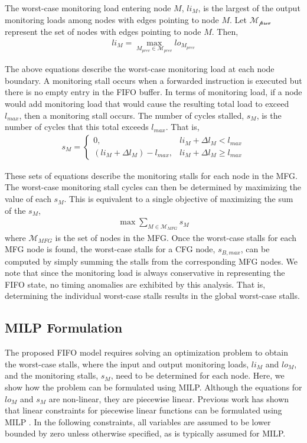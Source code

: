 The worst-case monitoring load entering node $M$, $li_{M}$, is the largest of
the output monitoring loads among nodes with edges pointing to node $M$. Let
$\mathcal{M_{\text{prev}}}$ represent the set of nodes with edges pointing to
node $M$. Then,
\begin{align*}
	li_{M} = \max_{M_{prev} \in \mathcal{M}_{prev}}lo_{M_{prev}}
\end{align*}

The above equations describe the worst-case monitoring load at each node
boundary.  A monitoring stall occurs when a forwarded instruction is executed
but there is no empty entry in the FIFO buffer. In terms of monitoring load, if
a node would add monitoring load that would cause the resulting total load to
exceed $l_{max}$, then a monitoring stall occurs. The number of cycles stalled,
$s_{M}$, is the number of cycles that this total exceeds $l_{max}$. That is,
\begin{align*}
	s_{M} =
		\begin{cases}
			0, &li_{M} + \Delta l_{M} < l_{max} \\
			(li_{M} + \Delta l_{M}) - l_{max}, &li_{M} + \Delta l_M \geq l_{max}
		\end{cases}
\end{align*}

These sets of equations describe the monitoring stalls for each node in the MFG.
The worst-case monitoring stall cycles can then be determined by maximizing the
value of each $s_M$. This is equivalent to a single objective of maximizing the
sum of the $s_M$,
\begin{align*}
  \max \sum_{M \in \mathcal{M}_{MFG}} s_{M}
\end{align*}
where $\mathcal{M}_{MFG}$ is the set of nodes in the MFG.  Once the worst-case
stalls for each MFG node is found, the worst-case stalls for a CFG node,
$s_{B,max}$, can be computed by simply summing the stalls from the
corresponding MFG nodes. We note that since the monitoring load is always
conservative in representing the FIFO state, no timing anomalies are exhibited
by this analysis. That is, determining the individual worst-case stalls results
in the global worst-case stalls.

\subsection{MILP Formulation}
\label{sec:formulation:milp}

The proposed FIFO model requires solving an optimization problem to obtain the
worst-case stalls, where the input and output monitoring loads, $li_{M}$ and
$lo_{M}$, and the monitoring stalls, $s_{M}$, need to be determined for each
node. Here, we show how the problem can be formulated using MILP. Although the
equations for $lo_{M}$ and $s_{M}$ are non-linear, they are piecewise linear.
Previous work has shown that linear constraints for piecewise linear functions
can be formulated using MILP \cite{sierksma-lp}. In the following constraints,
all variables are assumed to be lower bounded by zero unless otherwise
specified, as is typically assumed for MILP.

